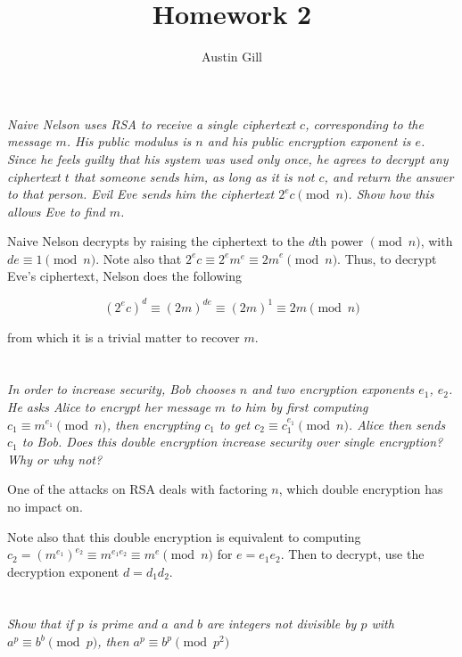 \documentclass[12pt]{article}
\title{Homework 2}
\author{Austin Gill}
\begin{document}
\maketitle

\section{} \textit{Naive Nelson uses RSA to receive a single ciphertext $c$, corresponding to the message $m$. His public modulus is $n$ and his public encryption exponent is $e$. Since he feels guilty that his system was used only once, he agrees to decrypt any ciphertext $t$ that someone sends him, as long as it is not $c$, and return the answer to that person.  Evil Eve sends him the ciphertext ${2^e}c \pmod{n}$. Show how this allows Eve to find $m$.}

    Naive Nelson decrypts by raising the ciphertext to the $d$th power $\pmod{n}$, with $de \equiv 1 \pmod{n}$. Note also that $2^e c \equiv 2^e m^e \equiv {2m}^e \pmod{n}$. Thus, to decrypt Eve's ciphertext, Nelson does the following

    $${(2^e c)}^d \equiv {(2m)}^{de} \equiv (2m)^1 \equiv 2m \pmod{n}$$

    from which it is a trivial matter to recover $m$.

\section{} \textit{In order to increase security, Bob chooses $n$ and two encryption exponents $e_1$, $e_2$. He asks Alice to encrypt her message $m$ to him by first computing $c_1 \equiv m^{e_1} \pmod{n}$, then encrypting $c_1$ to get $c_2 \equiv c_1^{e_1} \pmod{n}$. Alice  then sends $c_1$ to Bob.  Does this double encryption increase security over single encryption?  Why or why not?}

    One of the attacks on RSA deals with factoring $n$, which double encryption has no impact on.

    Note also that this double encryption is equivalent to computing $c_2 = (m^{e_1})^{e_2} \equiv m^{e_1 e_2} \equiv m^e \pmod{n}$ for $e = e_1 e_2$. Then to decrypt, use the decryption exponent $d = d_1d_2$.

\section{} \textit{Show that if $p$ is prime and $a$ and $b$ are integers not divisible by $p$ with $a^p \equiv b^b \pmod{p}$, then $a^p \equiv b^p \pmod{p^2}$}
\end{document}
